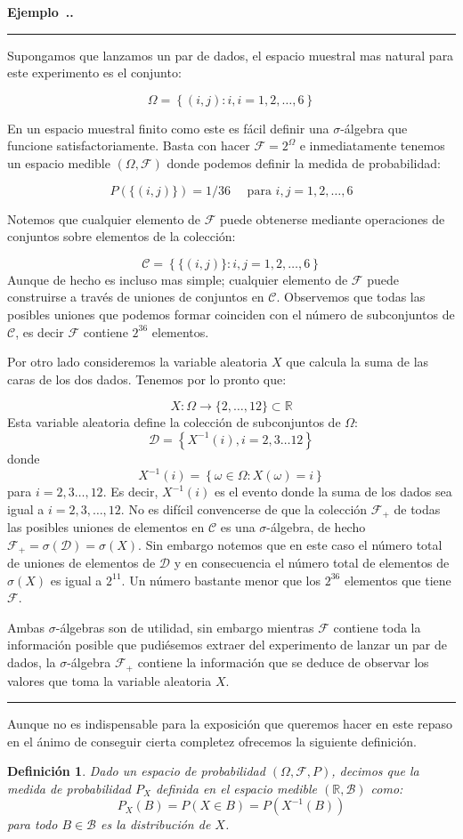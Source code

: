 \documentclass{extreport}
\newcounter{example}[chapter]
\newenvironment{example}[1][]{\refstepcounter{example}\par\medskip
   \noindent\textbf{Ejemplo~\thechapter.\theexample. #1 }\par\medskip\hrule \rmfamily\par\medskip}{\medskip\hrule\medskip}
\theoremstyle{definicion}
\newtheorem{definition}{Definición}[chapter]
\theoremstyle{propiedad}
\theoremstyle{teorema}
\begin{document}
\begin{example}
    Supongamos que lanzamos un par de dados, el espacio muestral mas natural para este experimento es el conjunto:

$$
\Omega = \left\{(i,j): i, i = 1,2,\ldots, 6\right\}
$$


En un espacio muestral finito como este es fácil definir una $\sigma$-álgebra que funcione satisfactoriamente. Basta con hacer $\mathcal{F}= 2^\Omega$ e inmediatamente tenemos un espacio medible $(\Omega, \mathcal{F})$ donde podemos definir la medida de probabilidad:

$$
P(\{(i,j)\}) = 1/36\quad \text{ para } i,j= 1,2,\ldots, 6 
$$

Notemos que cualquier elemento de $\mathcal{F}$ puede obtenerse mediante operaciones de conjuntos sobre  elementos de la colección:

$$
\mathcal{C} = \left\{\{(i,j)\}: i,j= 1,2,\ldots,6\right\}
$$
Aunque de hecho es incluso mas simple; cualquier elemento de $\mathcal{F}$ puede construirse a través de uniones de conjuntos en $\mathcal{C}$. Observemos que todas las posibles uniones que podemos formar coinciden con el número de subconjuntos de $\mathcal{C}$, es decir $\mathcal{F}$  contiene $2^{36}$ elementos.

Por otro lado consideremos la variable aleatoria $X$ que calcula la suma de las caras de los dos dados. Tenemos por lo pronto que:    

$$
X:\Omega \rightarrow \{2,\ldots, 12\}\subset \mathbb{R}
$$
Esta variable aleatoria define la colección de subconjuntos de $\Omega$:
$$
\mathcal{D} = \left\{ X^{-1}(i),i =2,3\ldots 12\right\}
$$
donde 
$$
X^{-1}(i) = \left\{\omega\in\Omega: X(\omega)=i\right\}
$$
para $i=2,3\ldots, 12.$  Es decir, $X^{-1}(i)$ es el evento donde la suma de los dados sea igual a $i = 2,3,\ldots, 12$. No es difícil convencerse de que la colección ${\mathcal F}_{+}$ de todas las posibles uniones de elementos en $\mathcal{C}$ es una $\sigma$-álgebra, de hecho $\mathcal{F}_+ = \sigma(\mathcal{D}) = \sigma(X)$. Sin embargo notemos que en este caso el número total de uniones de elementos de $\mathcal{D}$ y en consecuencia el número total de elementos de $\sigma(X)$ es igual a $2^{11}$. Un número bastante menor que los $2^{36}$ elementos que tiene $\mathcal F$.

Ambas $\sigma$-álgebras son de utilidad, sin embargo mientras $\mathcal{F}$ contiene toda la información posible que pudiésemos extraer del experimento de lanzar un par de dados, la $\sigma$-álgebra $\mathcal F_{+}$ contiene la información que se deduce de observar los valores que toma la variable aleatoria $X$. 
\end{example}
Aunque no es indispensable para la exposición que queremos hacer en este repaso en el ánimo de conseguir cierta completez ofrecemos la siguiente definición.
\begin{definition}
    Dado un espacio de probabilidad $(\Omega, \mathcal{F}, P)$, decimos que la medida de probabilidad $P_X$ definida en el espacio medible $(\mathbb{R}, \mathcal{B})$ como:
    $$
    P_X(B) = P\left(X\in B\right)  = P(X^{-1}(B))
    $$
    para todo $B\in\mathcal{B}$ es la \emph{distribución} de $X$.
\end{definition}
\end{document}
